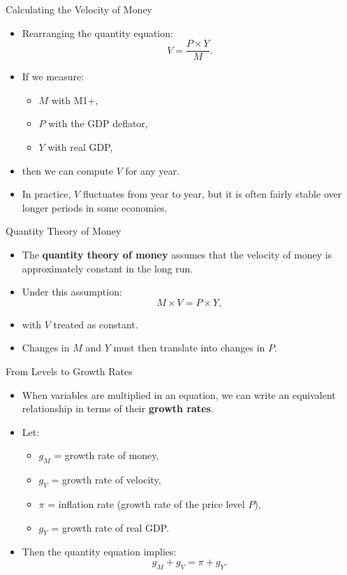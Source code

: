 \documentclass[aspectratio=169]{beamer}
\begin{document}
\begin{frame}{Calculating the Velocity of Money}
\transfade
\begin{itemize}
  \item Rearranging the quantity equation:
  \[
    V = \frac{P \times Y}{M}.
  \]
  \item If we measure:
  \begin{itemize}
    \item \(M\) with M1+,
    \item \(P\) with the GDP deflator,
    \item \(Y\) with real GDP,
  \end{itemize}
  \item then we can compute \(V\) for any year.
  \item In practice, \(V\) fluctuates from year to year, but it is often fairly stable over longer periods in some economies.
\end{itemize}
\end{frame}

\begin{frame}{Quantity Theory of Money}
\transfade
\begin{itemize}
  \item The \textbf{quantity theory of money} assumes that the velocity of money is approximately constant in the long run.
  \item Under this assumption:
  \[
    M \times V = P \times Y,
  \]
  \item with \(V\) treated as constant.
  \item Changes in \(M\) and \(Y\) must then translate into changes in \(P\).
\end{itemize}
\end{frame}

\begin{frame}{From Levels to Growth Rates}
\transfade
\begin{itemize}
  \item When variables are multiplied in an equation, we can write an equivalent relationship in terms of their \textbf{growth rates}.
  \item Let:
  \begin{itemize}
    \item \(g_{M}\) = growth rate of money,
    \item \(g_{V}\) = growth rate of velocity,
    \item \(\pi\) = inflation rate (growth rate of the price level \(P\)),
    \item \(g_{Y}\) = growth rate of real GDP.
  \end{itemize}
  \item Then the quantity equation implies:
  \[
    g_{M} + g_{V} = \pi + g_{Y}.
  \]
\end{itemize}
\end{frame}
\end{document}
